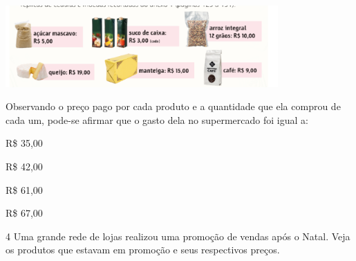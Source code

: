 
\includegraphics[width=4.10036in,height=1.22511in]{./media/image74.png}

Observando o preço pago por cada produto e a quantidade que ela comprou de cada um, pode-se afirmar que o gasto dela no supermercado foi igual a:

\begin{minipage}{.5\textwidth}
\begin{escolha}

\item
  R\$ 35,00
\item
  R\$ 42,00
\item
  R\$ 61,00
\item
  R\$ 67,00
\end{escolha}
\end{minipage}

\num{4} Uma grande rede de lojas realizou uma promoção de vendas após o Natal.
Veja os produtos que estavam em promoção e seus respectivos preços.





